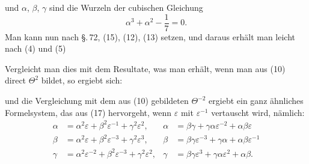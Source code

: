 und $\alpha$, $\beta$, $\gamma$ sind die Wurzeln der cubischen Gleichung
\[ \alpha^3 + \alpha^2 - \frac{1}{7} = 0. \]
Man kann nun nach \S.\,72, (15), (12), (13)
setzen, und daraus erhält man leicht nach (4) und (5)

Vergleicht man dies mit dem Resultate, was man erhält, wenn man aus (10) direct $\Theta^2$ bildet, so ergiebt sich:

und die Vergleichung mit dem aus (10) gebildeten $\Theta^{-2}$ ergiebt ein ganz ähnliches Formelsystem, das aus (17) hervorgeht, wenn $\varepsilon$ mit $\varepsilon^{-1}$ vertauscht wird, nämlich:
\[ \begin{aligned}
\alpha &= \alpha^2\varepsilon + \beta^2\varepsilon^{-1} + \gamma^2\varepsilon^2, & \alpha &= \beta\gamma + \gamma\alpha\varepsilon^{-2} + \alpha\beta\varepsilon \\
\beta &= \alpha^2\varepsilon + \beta^2\varepsilon^{-3} + \gamma^2\varepsilon^3, & \beta &= \beta\gamma\varepsilon^{-3} + \gamma\alpha + \alpha\beta\varepsilon^{-1} \\
\gamma &= \alpha^2\varepsilon^{-2} + \beta^2\varepsilon^{-3} + \gamma^2\varepsilon^2, & \gamma &= \beta\gamma\varepsilon^3 + \gamma\alpha\varepsilon^2 + \alpha\beta.
\end{aligned} \]

